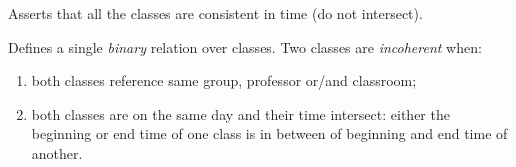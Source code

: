 \documentclass[../header]{subfiles}
\begin{document}
Asserts that all the classes are consistent in time (do not intersect).

Defines a single \emph{binary} relation over classes.
Two classes are \emph{incoherent} when:
\begin{enumerate}
  \item both classes reference same group, professor or/and classroom;
  \item both classes are on the same day and their time intersect:
          either the beginning or end time of one class is in between of
          beginning and end time of another.
\end{enumerate}

\begin{center}
  
\end{center}
\end{document}
